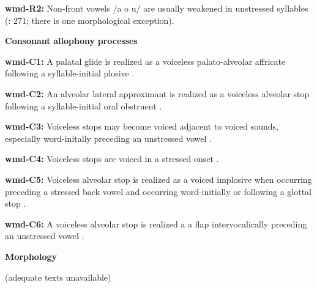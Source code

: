 \documentclass[output=paper]{langsci/langscibook}
\begin{document}
\begin{styleBody}
\textbf{wmd-R2:} Non-front vowels /a o u/ are usually weakened in unstressed syllables (\citealt{Eberhard2009}: 271; there is one morphological exception).
\end{styleBody}

\begin{styleBody}
\textbf{Consonant} \textbf{allophony} \textbf{processes}
\end{styleBody}

\begin{styleBody}
\textbf{wmd-C1:} A palatal glide is realized as a voiceless palato-alveolar affricate following a syllable-initial plosive \citep[94]{Eberhard2009}.
\end{styleBody}

\begin{styleBody}
\textbf{wmd-C2:} An alveolar lateral approximant is realized as a voiceless alveolar stop following a syllable-initial oral obstruent \citep[92]{Eberhard2009}.
\end{styleBody}

\begin{styleBody}
\textbf{wmd-C3:} Voiceless stops may become voiced adjacent to voiced sounds, especially word-initally preceding an unstressed vowel \citep{Eberhard2009}.
\end{styleBody}

\begin{styleBody}
\textbf{wmd-C4:} Voiceless stops are voiced in a stressed onset \citep[55]{Eberhard2009}.
\end{styleBody}

\begin{styleBody}
\textbf{wmd-C5:} Voiceless alveolar stop is realized as a voiced implosive when occurring preceding a stressed back vowel and occurring word-initially or following a glottal stop \citep[58]{Eberhard2009}.
\end{styleBody}

\begin{styleBody}
\textbf{wmd-C6:} A voiceless alveolar stop is realized a a flap intervocalically preceding an unstressed vowel \citep[55]{Eberhard2009}.
\end{styleBody}

\begin{styleBody}
\textbf{Morphology}
\end{styleBody}

\begin{styleBody}
(adequate texts unavailable)
\end{styleBody}
\end{document}

